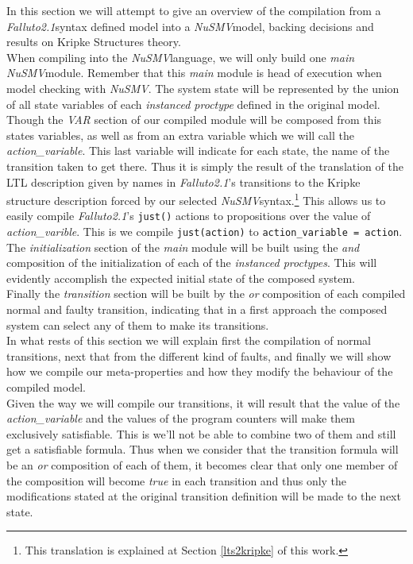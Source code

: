 \documentclass[12pt]{article}
\newcommand{\nusmv}{\mbox{\textit{NuSMV}}}
\newcommand{\falluto}{\mbox{\textit{Falluto2.1}}}
\begin{document}
In this section we will attempt to give an overview of the compilation from a \falluto syntax defined model into a \nusmv model, backing decisions and results on Kripke Structures theory.\\
When compiling into the \nusmv language, we will only build one \textit{main} \nusmv module. Remember that this \textit{main} module is head of execution when model checking with \nusmv. The system state will be represented by the union of all state variables of each \textit{instanced proctype} defined in the original model. Though the \textit{VAR} section of our compiled module will be composed from this states variables, as well as from an extra variable which we will call the \textit{action\_variable}. This last variable will indicate for each state, the name of the transition taken to get there. Thus it is simply the result of the translation of the LTL description given by names in \falluto's transitions to the Kripke structure description forced by our selected \nusmv syntax.\footnote{ This translation is explained at Section \ref{lts2kripke} of this work.} This allows us to easily compile \falluto's \texttt{just()} actions to propositions over the value of \textit{action\_varible}. This is we compile \texttt{just(action)} to \texttt{action\_variable = action}.\\
The \textit{initialization} section of the \textit{main} module will be built using the \textit{and} composition of the initialization of each of the \textit{instanced proctypes}. This will evidently accomplish the expected initial state of the composed system.\\
Finally the \textit{transition} section will be built by the \textit{or} composition of each compiled normal and faulty transition, indicating that in a first approach the composed system can select any of them to make its transitions.\\
In what rests of this section we will explain first the compilation of normal transitions, next that from the different kind of faults, and finally we will show how we compile our meta-properties and how they modify the behaviour of the compiled model.\\
Given the way we will compile our transitions, it will result that the value of the \textit{action\_variable} and the values of the program counters will make them exclusively satisfiable. This is we'll not be able to combine two of them and still get a satisfiable formula. Thus when we consider that the transition formula will be an \textit{or} composition of each of them, it becomes clear that only one member of the composition will become \textit{true} in each transition and thus only the modifications stated at the original transition definition will be made to the next state.
\end{document}
